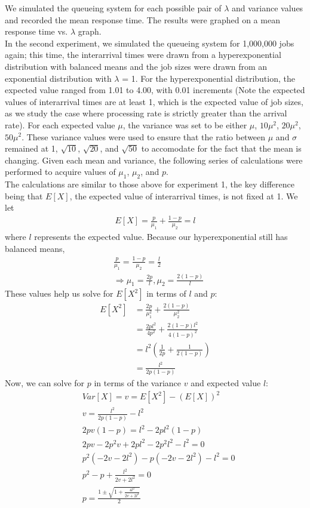 \documentclass[12pt]{article}
\begin{document}
We simulated the queueing system for each possible pair of $\lambda$ and variance values and recorded the mean response time. The results were graphed on a mean response time vs. $\lambda$ graph. \\

In the second experiment, we simulated the queueing system for 1,000,000 jobs again; this time, the interarrival times were drawn from a hyperexponential distribution with balanced means and the job sizes were drawn from an exponential distribution with $\lambda$ = 1. For the hyperexponential distribution, the expected value ranged from 1.01 to 4.00, with 0.01 increments (Note the expected values of interarrival times are at least 1, which is the expected value of job sizes, as we study the case where processing rate is strictly greater than the arrival rate). For each expected value $\mu$, the variance was set to be either $\mu$, $10\mu^2$, $20\mu^2$, $50\mu^2$. These variance values were used to ensure that the ratio between $\mu$ and $\sigma$ remained at 1, $\sqrt{10}$, $\sqrt{20}$, and $\sqrt{50}$ to accomodate for the fact that the mean is changing. Given each mean and variance, the following series of calculations were performed to acquire values of $\mu_1$, $\mu_2$, and $p$. \\

The calculations are similar to those above for experiment 1, the key difference being that $E[X]$, the expected value of interarrival times, is not fixed at 1. We let
\begin{align*}
E[X] = \frac{p}{\mu_1} + \frac{1-p}{\mu_2} = l
\end{align*}
where $l$ represents the expected value. Because our hyperexponential still has balanced means, 
\begin{align*}
&\frac{p}{\mu_1} = \frac{1-p}{\mu_2} = \frac{l}{2} \\
&\Rightarrow \mu_1 = \frac{2p}{l}, \mu_2 = \frac{2(1-p)}{l}
\end{align*}
These values help us solve for $E[X^2]$ in terms of $l$ and $p$: 
\begin{align*}
E[X^2] &= \frac{2p}{\mu_1^2} + \frac{2(1-p)}{\mu_2^2} \\
&= \frac{2pl^2}{4p^2} + \frac{2(1-p)l^2}{4(1-p)^2} \\ 
&= l^2(\frac{1}{2p} + \frac{1}{2(1-p)}) \\
&= \frac{l^2}{2p(1-p)}
\end{align*}
Now, we can solve for $p$ in terms of the variance $v$ and expected value $l$: 
\begin{align*}
&Var[X] = v = E[X^2] - (E[X])^2 \\
&v = \frac{l^2}{2p(1-p)} - l^2 \\
&2pv(1-p) = l^2 - 2pl^2(1-p) \\ 
&2pv - 2p^2v + 2pl^2 - 2p^2l^2 - l^2 = 0 \\ 
&p^2(-2v - 2l^2) - p(-2v - 2l^2) - l^2 = 0 \\ 
&p^2 - p + \frac{l^2}{2v + 2l^2} = 0 \\ 
&p = \frac{1 \pm \sqrt{1 + \frac{4l^2}{2v + 2l^2}}}{2}
\end{align*}
\end{document}
